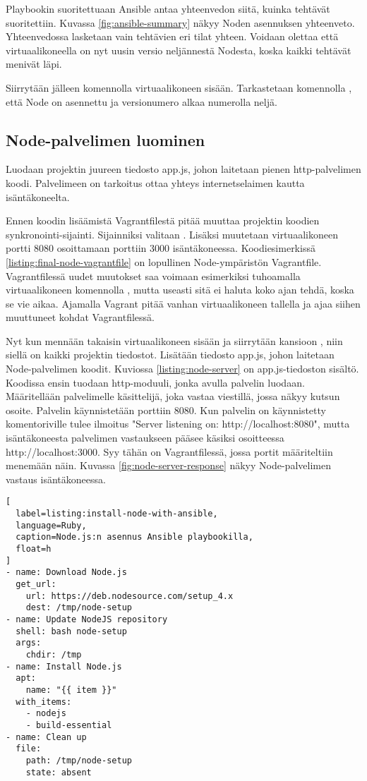 Playbookin suoritettuaan Ansible antaa yhteenvedon siitä, kuinka tehtävät suoritettiin. Kuvassa \ref{fig:ansible-summary} näkyy Noden asennuksen yhteenveto. Yhteenvedossa lasketaan vain tehtävien eri tilat yhteen. Voidaan olettaa että virtuaalikoneella on nyt uusin versio neljännestä Nodesta, koska kaikki tehtävät menivät läpi.

Siirrytään jälleen komennolla  virtuaalikoneen sisään. Tarkastetaan komennolla , että Node on asennettu ja versionumero alkaa numerolla neljä.

\subsection{Node-palvelimen luominen}

Luodaan projektin juureen tiedosto app.js, johon laitetaan pienen http-palvelimen koodi. Palvelimeen on tarkoitus ottaa yhteys internetselaimen kautta isäntäkoneelta.

Ennen koodin lisäämistä Vagrantfilestä pitää muuttaa projektin koodien synkronointi-sijainti. Sijainniksi valitaan . Lisäksi muutetaan virtuaalikoneen portti 8080 osoittamaan porttiin 3000 isäntäkoneessa. Koodiesimerkissä \ref{listing:final-node-vagrantfile} on lopullinen Node-ympäristön Vagrantfile. Vagrantfilessä uudet muutokset saa voimaan esimerkiksi tuhoamalla virtuaalikoneen komennolla , mutta useasti sitä ei haluta koko ajan tehdä, koska se vie aikaa. Ajamalla  Vagrant pitää vanhan virtuaalikoneen tallella ja ajaa siihen muuttuneet kohdat Vagrantfilessä.

Nyt kun mennään takaisin virtuaalikoneen sisään ja siirrytään kansioon , niin siellä on kaikki projektin tiedostot. Lisätään tiedosto app.js, johon laitetaan Node-palvelimen koodit. Kuviossa \ref{listing:node-server} on app.js-tiedoston sisältö. Koodissa ensin tuodaan http-moduuli, jonka avulla palvelin luodaan. Määritellään palvelimelle käsittelijä, joka vastaa viestillä, jossa näkyy kutsun osoite. Palvelin käynnistetään porttiin 8080. Kun palvelin on käynnistetty komentoriville tulee ilmoitus "Server listening on: http://localhost:8080", mutta isäntäkoneesta palvelimen vastaukseen pääsee käsiksi osoitteessa http://localhost:3000. Syy tähän on Vagrantfilessä, jossa portit määriteltiin menemään näin. Kuvassa \ref{fig:node-server-response} näkyy Node-palvelimen vastaus isäntäkoneessa.

\begin{lstlisting}[
  label=listing:install-node-with-ansible,
  language=Ruby,
  caption=Node.js:n asennus Ansible playbookilla,
  float=h
]
- name: Download Node.js
  get_url:
    url: https://deb.nodesource.com/setup_4.x
    dest: /tmp/node-setup
- name: Update NodeJS repository
  shell: bash node-setup
  args:
    chdir: /tmp
- name: Install Node.js
  apt:
    name: "{{ item }}"
  with_items:
    - nodejs
    - build-essential
- name: Clean up
  file:
    path: /tmp/node-setup
    state: absent
\end{lstlisting}

